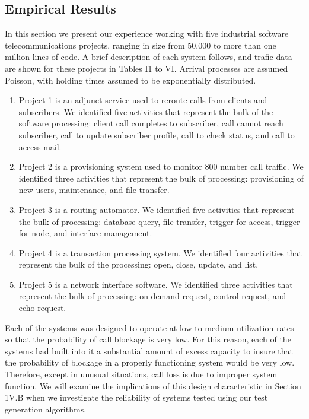 \documentclass[journal, twoside]{IEEEtran}
\begin{document}
\subsection{Empirical Results}
In this section we present our experience working with five
industrial software telecommunications projects, ranging in
size from 50,000 to more than one million lines of code. A
brief description of each system follows, and trafic data are
shown for these projects in Tables I1 to VI. Arrival processes
are assumed Poisson, with holding times assumed to be exponentially distributed. 
\begin{enumerate}
    \item Project 1 is an adjunct service used to reroute calls from clients and subscribers. We identified five activities that represent the bulk of the software processing: client call completes to subscriber, call cannot reach subscriber, call to update subscriber profile, call to check status, and call to access mail. 
    \item Project 2 is a provisioning system used to monitor 800 number call traffic. We identified three activities that represent the bulk of processing: provisioning of new users, maintenance, and file transfer. 
    \item  Project 3 is a routing automator. We identified five activities that represent the bulk of processing: database query, file transfer, trigger for access, trigger for node, and interface management. 
    \item  Project 4 is a transaction processing system. We identified four activities that represent the bulk of the processing: open, close, update, and list. 
    \item Project 5 is a network interface software. We identified three activities that represent the bulk of processing: on demand request, control request, and echo request. 
\end{enumerate}
Each of the systems was designed to operate at low to medium utilization rates so that the probability of call blockage is
very low. For this reason, each of the systems had built into it
a substantial amount of excess capacity to insure that the probability of blockage in a properly functioning system would be
very low. Therefore, except in unusual situations, call loss is
due to improper system function. We will examine the implications of this design characteristic in Section 1V.B when we
investigate the reliability of systems tested using our test generation algorithms. 
\end{document}
